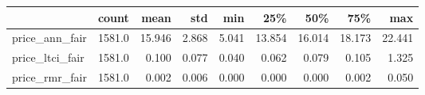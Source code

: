 \begin{tabular}{lrrrrrrrr}
\toprule
{} &   count &    mean &    std &    min &     25\% &     50\% &     75\% &     max \\
\midrule
price\_ann\_fair  &  1581.0 &  15.946 &  2.868 &  5.041 &  13.854 &  16.014 &  18.173 &  22.441 \\
price\_ltci\_fair &  1581.0 &   0.100 &  0.077 &  0.040 &   0.062 &   0.079 &   0.105 &   1.325 \\
price\_rmr\_fair  &  1581.0 &   0.002 &  0.006 &  0.000 &   0.000 &   0.000 &   0.002 &   0.050 \\
\bottomrule
\end{tabular}
